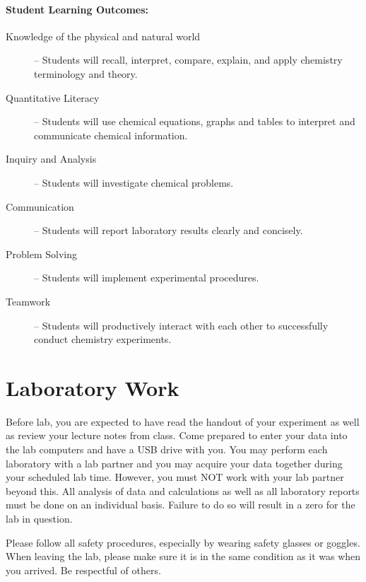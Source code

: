 \documentclass[12pt, letterpaper]{article}
\begin{document}
\paragraph{Student Learning Outcomes:}
\begin{description}
	\item[Knowledge of the physical and natural world] -- Students will recall, interpret, compare, explain, and apply chemistry terminology and theory.
	\item[Quantitative Literacy] -- Students will use chemical equations, graphs and tables to interpret and communicate chemical information.
	\item[Inquiry and Analysis] -- Students will investigate chemical problems.
	\item[Communication] -- Students will report laboratory results clearly and concisely.
	\item[Problem Solving] -- Students will implement experimental procedures.
	\item[Teamwork] -- Students will productively interact with each other to successfully conduct chemistry experiments.
\end{description}

\section*{Laboratory Work}
Before lab, you are expected to have read the handout of your experiment as well as review your lecture notes from class. Come prepared to enter your data into the lab computers and have a USB drive with you. You may perform each laboratory with a lab partner and you may acquire your data together during your scheduled lab time. However, you must NOT work with your lab partner beyond this. All analysis of data and calculations as well as all laboratory reports must be done on an individual basis. Failure to do so will result in a zero for the lab in question.

\noindent Please follow all safety procedures, especially by wearing safety glasses or goggles. When leaving the lab, please make sure it is in the same condition as it was when you arrived. Be respectful of others.
\end{document}
